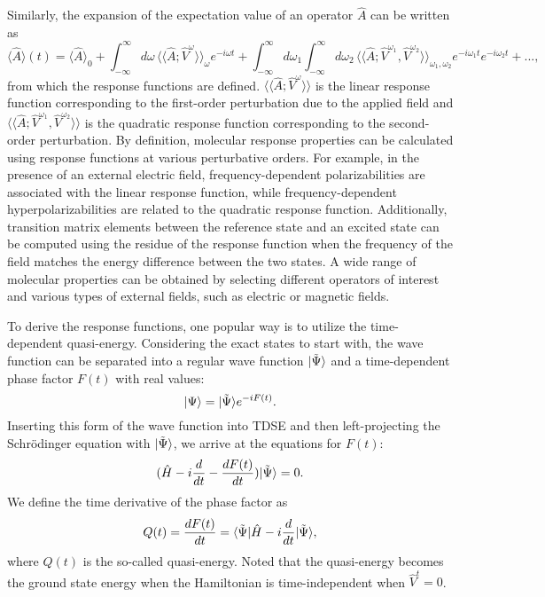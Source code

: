 Similarly, the expansion of the expectation value of an operator $\hat{A}$ can be written as
\begin{equation}
\langle \hat{A}\rangle(t) = \langle \hat{A}\rangle_{0} + 
                                     \int_{-\infty}^{\infty} d\omega \,  \langle\langle \hat{A};\hat{V}^{\omega}\rangle\rangle_{\omega} e^{-i\omega t} + 
                                     \int_{-\infty}^{\infty} d\omega_{1} \int_{-\infty}^{\infty} d\omega_{2} \, 
                                     \langle\langle \hat{A};\hat{V}^{\omega_{1}}, \hat{V}^{\omega_{2}} \rangle\rangle_{\omega_{1}, \omega_{2}} e^{-i\omega_{1} t}e^{-i\omega_{2} t} + ...,
\label{eq:response-exp-val}                                   
\end{equation}
from which the response functions are defined. $\langle\langle \hat{A};\hat{V}^{\omega}\rangle\rangle$ is the linear response function corresponding to the first-order perturbation due to the applied field and $\langle\langle \hat{A};\hat{V}^{\omega_{1}}, \hat{V}^{\omega_{2}} \rangle\rangle$  is the quadratic response function corresponding to the second-order perturbation. By definition, molecular response properties can be calculated using response functions at various perturbative orders. For example, in the presence of an external electric field, frequency-dependent polarizabilities are associated with the linear response function, while frequency-dependent hyperpolarizabilities are related to the quadratic response function. Additionally, transition matrix elements between the reference state and an excited state can be computed using the residue of the response function when the frequency of the field matches the energy difference between the two states. A wide range of molecular properties can be obtained by selecting different operators of interest and various types of external fields, such as electric or magnetic fields.\cite{Helgaker2012, Mukherjee1979, Olsen1985, Luo1995, Autschbach2002, Crawford2006, Bast2011}

To derive the response functions, one popular way is to utilize the time-dependent quasi-energy.\cite{Christiansen1998} Considering the exact states to start with, the wave function can be separated into a regular wave function $| \tilde{\Psi} \rangle$ and a time-dependent phase factor $F(t)$ with real values:
\begin{equation}
| \Psi \rangle = | \tilde{\Psi} \rangle e^{-iF(t)}.
\end{equation}
Inserting this form of the wave function into TDSE and then left-projecting the Schr\"odinger equation with $| \tilde{\Psi} \rangle$, we arrive at the equations for $F(t)$:
\begin{equation}
(\hat{H} - i\frac{d}{dt} - \frac{dF(t)}{dt} )| \tilde{\Psi} \rangle = 0.
\label{eq:response-quasi-SE}
\end{equation}
We define the time derivative of the phase factor as
\begin{equation}
Q(t) = \frac{dF(t)}{dt} = \langle\tilde{\Psi} |\hat{H}-i\frac{d}{dt}| \tilde{\Psi} \rangle,
\label{eq:response-quasi}
\end{equation}
where $Q(t)$ is the so-called quasi-energy. Noted that the quasi-energy becomes the ground state energy when the Hamiltonian is time-independent when $\hat{V}^{t} = 0$. 

